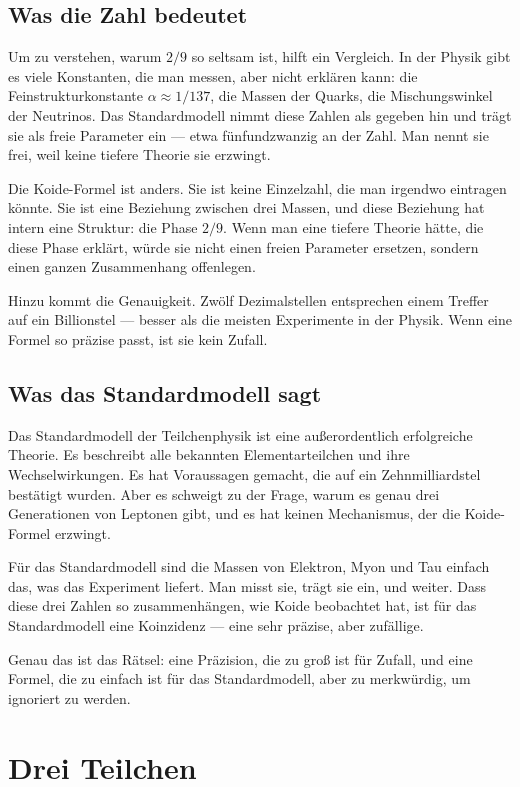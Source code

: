 \documentclass[12pt,oneside]{book}
\begin{document}
\section{Was die Zahl bedeutet}

Um zu verstehen, warum $2/9$ so seltsam ist, hilft ein Vergleich. In der Physik gibt es viele Konstanten, die man messen, aber nicht erklären kann: die Fein\-struktur\-konstante $\alpha \approx 1/137$, die Massen der Quarks, die Mischungswinkel der Neutrinos. Das Standardmodell nimmt diese Zahlen als gegeben hin und trägt sie als freie Parameter ein — etwa fünfundzwanzig an der Zahl. Man nennt sie frei, weil keine tiefere Theorie sie erzwingt.

Die Koide-Formel ist anders. Sie ist keine Einzelzahl, die man irgendwo eintragen könnte. Sie ist eine Beziehung zwischen drei Massen, und diese Beziehung hat intern eine Struktur: die Phase $2/9$. Wenn man eine tiefere Theorie hätte, die diese Phase erklärt, würde sie nicht einen freien Parameter ersetzen, sondern einen ganzen Zusammenhang offenlegen.

Hinzu kommt die Genauigkeit. Zwölf Dezimalstellen entsprechen einem Treffer auf ein Billionstel — besser als die meisten Experimente in der Physik. Wenn eine Formel so präzise passt, ist sie kein Zufall.

\section{Was das Standardmodell sagt}

Das Standardmodell der Teilchenphysik ist eine außerordentlich erfolgreiche Theorie. Es beschreibt alle bekannten Elementarteilchen und ihre Wechselwirkungen. Es hat Voraussagen gemacht, die auf ein Zehnmilliardstel bestätigt wurden. Aber es schweigt zu der Frage, warum es genau drei Generationen von Leptonen gibt, und es hat keinen Mechanismus, der die Koide-Formel erzwingt.

Für das Standardmodell sind die Massen von Elektron, Myon und Tau einfach das, was das Experiment liefert. Man misst sie, trägt sie ein, und weiter. Dass diese drei Zahlen so zusammenhängen, wie Koide beobachtet hat, ist für das Standardmodell eine Koinzidenz — eine sehr präzise, aber zufällige.

Genau das ist das Rätsel: eine Präzision, die zu groß ist für Zufall, und eine Formel, die zu einfach ist für das Standardmodell, aber zu merkwürdig, um ignoriert zu werden.

\chapter{Drei Teilchen}
\end{document}
